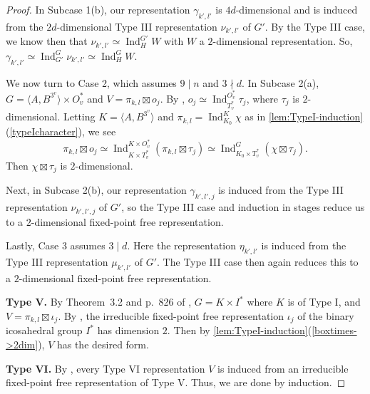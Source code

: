 \documentclass{amsart}
\theoremstyle{definition}
\DeclareMathOperator{\Ind}{Ind}
\begin{document}
\begin{proof}
In Subcase 1(b), our representation $\gamma_{k',l'}$ is $4d$-dimensional and is induced from the $2d$-dimensional Type III representation $\nu_{k',l'}$ of $G'$. By the Type III case, we know then that $\nu_{k',l'}\simeq\Ind_H^{G'}W$ with $W$ a $2$-dimensional representation. So, $\gamma_{k',l'}\simeq\Ind_{G'}^G\nu_{k',l'}\simeq\Ind_H^GW$.

We now turn to Case 2, which assumes $9\mid n$ and $3\nmid d$. In Subcase 2(a), $G=\langle A,B^{3^v}\rangle\times O_v^*$ and $V=\pi_{k,l}\boxtimes o_j$. By \cite[Lemma 2.16]{Stepanov}, $o_j\simeq\Ind_{T_v^*}^{O_v^*}\tau_j$, where $\tau_j$ is $2$-dimensional. Letting $K=\langle A,B^{3^v}\rangle$ and $\pi_{k,l}=\Ind_{K_0}^K\chi$ as in \autoref{lem:TypeI-induction}(\ref{typeIcharacter}), we see
\[
    \pi_{k,l}\boxtimes o_j\simeq\Ind_{K\times T_v^*}^{K\times O_v^*}(\pi_{k,l}\boxtimes\tau_j)\simeq\Ind_{K_0\times T_v^*}^G(\chi\boxtimes\tau_j).
\]
Then $\chi\boxtimes\tau_j$ is $2$-dimensional.

Next, in Subcase 2(b), our representation $\gamma_{k',l',j}$ is induced from the Type III representation $\nu_{k',l',j}$ of $G'$, so the Type III case and induction in stages reduce us to a $2$-dimensional fixed-point free representation.

Lastly, Case 3 assumes $3\mid d$. Here the representation $\eta_{k',l'}$ is induced from the Type III representation $\mu_{k',l'}$ of $G'$. The Type III case then again reduces this to a $2$-dimensional fixed-point free representation.

\vspace{1em}
\noindent\textbf{Type V.}
By Theorem~3.2 and p.~826 of \cite{Stepanov}, $G=K\times I^*$ where $K$ is of Type I, and $V=\pi_{k,l}\boxtimes\iota_j$. By \cite[Lemma~2.17]{Stepanov}, the irreducible fixed-point free representation $\iota_j$ of the binary icosahedral group $I^*$ has dimension $2$. Then by \autoref{lem:TypeI-induction}(\ref{boxtimes->2dim}), $V$ has the desired form.

\vspace{1em}
\noindent\textbf{Type VI.}
By \cite[p.~826]{Stepanov}, every Type VI representation $V$ is induced from an irreducible fixed-point free representation of Type V. Thus, we are done by induction.
\end{proof}
\end{document}

